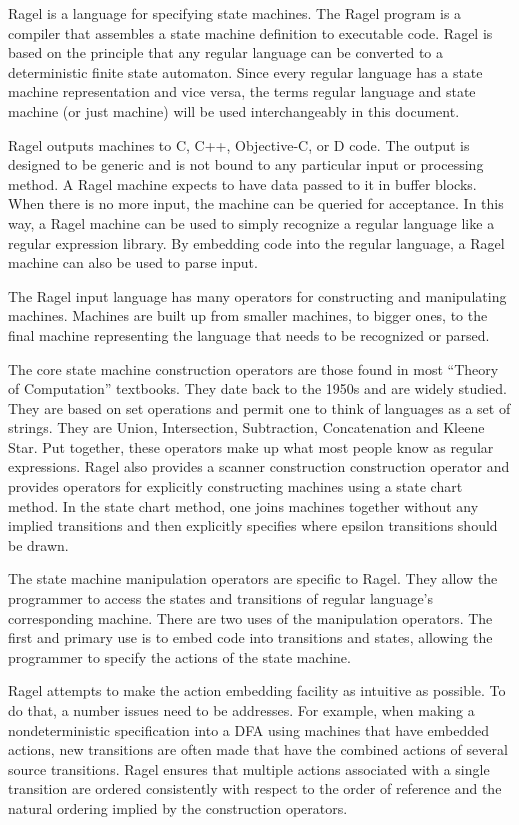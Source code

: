 \documentclass[letterpaper,11pt,oneside]{book}
\begin{document}
Ragel is a language for specifying state machines. The Ragel program is a
compiler that assembles a state machine definition to executable code.  Ragel
is based on the principle that any regular language can be converted to a
deterministic finite state automaton. Since every regular language has a state
machine representation and vice versa, the terms regular language and state
machine (or just machine) will be used interchangeably in this document.

Ragel outputs machines to C, C++, Objective-C, or D code. The output is
designed to be generic and is not bound to any particular input or processing
method. A Ragel machine expects to have data passed to it in buffer blocks.
When there is no more input, the machine can be queried for acceptance.  In
this way, a Ragel machine can be used to simply recognize a regular language
like a regular expression library. By embedding code into the regular language,
a Ragel machine can also be used to parse input.

The Ragel input language has many operators for constructing and manipulating
machines. Machines are built up from smaller machines, to bigger ones, to the
final machine representing the language that needs to be recognized or parsed.

The core state machine construction operators are those found in most ``Theory
of Computation'' textbooks. They date back to the 1950s and are widely studied.
They are based on set operations and permit one to think of languages as a set
of strings. They are Union, Intersection, Subtraction, Concatenation and Kleene
Star. Put together, these operators make up what most people know as regular
expressions. Ragel also provides a scanner construction construction operator 
and provides operators for explicitly constructing machines
using a state chart method. In the state chart method, one joins machines
together without any implied transitions and then explicitly specifies where
epsilon transitions should be drawn.

The state machine manipulation operators are specific to Ragel. They allow the
programmer to access the states and transitions of regular language's
corresponding machine. There are two uses of the manipulation operators. The
first and primary use is to embed code into transitions and states, allowing
the programmer to specify the actions of the state machine.

Ragel attempts to make the action embedding facility as intuitive as possible.
To do that, a number issues need to be addresses.  For example, when making a
nondeterministic specification into a DFA using machines that have embedded
actions, new transitions are often made that have the combined actions of
several source transitions. Ragel ensures that multiple actions associated with
a single transition are ordered consistently with respect to the order of
reference and the natural ordering implied by the construction operators.
\end{document}
